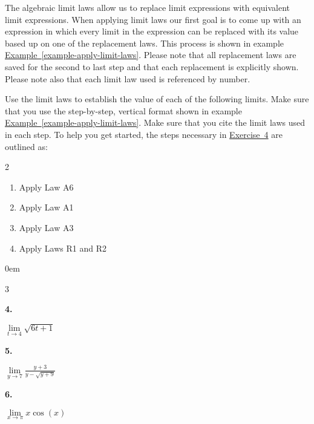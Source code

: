 \documentclass[12pt,]{book}
\theoremstyle{plain}
\theoremstyle{definition}
\numberwithin{equation}{section}
\newenvironment{exercisegroup}%
{\medskip\noindent}%
{\par\bigskip}%
\newlength{\exercisegroupindent}%
\newlength{\exercisegroupitemwidth}%
\newenvironment{exercisegrouplist}%
{\vspace{-\partopsep}%
\begin{adjustwidth}{\exercisegroupindent}{0em}}%
{\end{adjustwidth}%
\vspace{-\partopsep}%
\vspace{\baselineskip}}%
\newenvironment{exercisegroupbycol}[1]%
{\begin{exercisegrouplist}%
\vspace{-\multicolsep}%
\begin{multicols}{#1}%
\setlength{\parindent}{0em}%
\setlength{\exercisegroupitemwidth}{\linewidth}}%
{\end{multicols}%
\vspace{-\multicolsep}%
\end{exercisegrouplist}}%
\newenvironment{exercisegroupitem}[1]%
{\begin{minipage}[t]{\exercisegroupitemwidth}
\vspace{0pt}%
{\bfseries#1}%
\rule{0pt}{\baselineskip}}{\strut%
\end{minipage}%
\hspace{\columnsep}}%
\providecommand\phantomsection{}
\begin{document}
\begin{exercisegroup}%
The algebraic limit laws allow us to replace limit expressions with equivalent limit expressions. When applying limit laws our first goal is to come up with an expression in which every limit in the expression can be replaced with its value based up on one of the replacement laws. This process is shown in example \hyperref[example-apply-limit-laws]{Example~\ref*{example-apply-limit-laws}}. Please note that all replacement laws are saved for the second to last step and that each replacement is explicitly shown. Please note also that each limit law used is referenced by number.%
\par
Use the limit laws to establish the value of each of the following limits. Make sure that you use the step-by-step, vertical format shown in example \hyperref[example-apply-limit-laws]{Example~\ref*{example-apply-limit-laws}}. Make sure that you cite the limit laws used in each step. To help you get started, the steps necessary in \hyperref[exercise-first-apply-limit-laws]{Exercise~4} are outlined as:%
\begin{multicols}{2}
\begin{enumerate}[label=(\alph*)]
\item{}Apply Law A6\item{}Apply Law A1\item{}Apply Law A3\item{}Apply Laws R1 and R2\end{enumerate}
\end{multicols}
\par
\begin{exercisegroupbycol}{3}%
\begin{exercisegroupitem}{4. }\phantomsection\hypertarget{exercise-first-apply-limit-laws}{\null}
\(\lim\limits_{t\to4}\sqrt{6t+1}\)%
\end{exercisegroupitem}%
\par%
\begin{exercisegroupitem}{5. }\phantomsection\hypertarget{exercise-70}{\null}
\(\lim\limits_{y\to7}\frac{y+3}{y-\sqrt{y+9}}\)%
\end{exercisegroupitem}%
\par%
\begin{exercisegroupitem}{6. }\phantomsection\hypertarget{exercise-71}{\null}
\(\lim\limits_{x\to\pi}x\cos(x)\)%
\end{exercisegroupitem}%
\par%
\end{exercisegroupbycol}%
\end{exercisegroup}%
\typeout{************************************************}
\typeout{************************************************}
\end{document}
